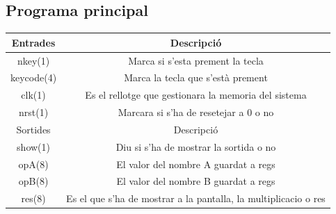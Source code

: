 \documentclass[12pt, a4papre]{article}
\begin{document}
	
	
	\subsection{Programa principal}
	
	\begin{table}[h!]
		\centering
		 \begin{tabular}{|c | c|} 
			 \hline
			 Entrades & Descripció\\ [0.5ex] 
			 \hline
			 nkey(1) &  Marca si s'esta prement la tecla \\ 
			 keycode(4) & Marca la tecla que s'està prement \\
			 clk(1) & Es el rellotge que gestionara la memoria del sistema  \\
			 nrst(1) & Marcara si s'ha de resetejar a 0 o no \\ [1ex] 
			 \hline\hline
			 Sortides & Descripció\\ [0.5ex] 
			 \hline
			 show(1) & Diu si s'ha de mostrar la sortida o no\\ 
			 opA(8) & El valor del nombre A guardat a regs\\
			 opB(8) & El valor del nombre B guardat a regs\\
			 res(8) & Es el que s'ha de mostrar a la pantalla, la multiplicacio o res\\ [1ex] 
			 \hline
		 \end{tabular}
	\end{table}
	
\end{document}
